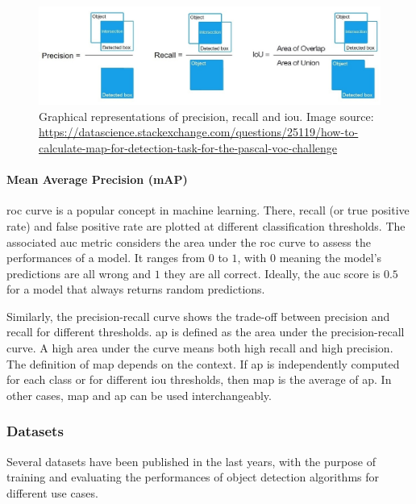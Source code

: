 \documentclass[%
    corpo=12pt,
    twoside,
    stile=classica,   
    tipotesi=magistrale,
    evenboxes,
    english,
	numerazioneromana,
]{toptesi}
\begin{document}
\begin{figure}[t]
	\centering
	\includegraphics[width=.95\linewidth]{imgs/precision_recall_iou.jpg}
	\caption[Graphical representations of precision, recall and \gls{iou}]{Graphical representations of precision, recall and \gls{iou}. Image source: \url{https://datascience.stackexchange.com/questions/25119/how-to-calculate-map-for-detection-task-for-the-pascal-voc-challenge}}
	\label{fig:iou}
\end{figure}

\paragraph{Mean Average Precision (mAP)}
\gls{roc} curve is a popular concept in machine learning. There, recall (or true positive rate) and false positive rate are plotted at different classification thresholds. The associated \gls{auc} metric considers the area under the \gls{roc} curve to assess the performances of a model.\cite{roc} It ranges from $ 0 $ to $ 1 $, with $ 0 $ meaning the model's predictions are all wrong and $ 1 $ they are all correct. Ideally, the \gls{auc} score is $ 0.5 $ for a model that always returns random predictions.

Similarly, the precision-recall curve shows the trade-off between precision and recall for different thresholds\cite{precrecall}. \gls{ap} is defined as the area under the precision-recall curve. A high area under the curve means both high recall and high precision. The definition of \gls{map} depends on the context. If \gls{ap} is independently computed for each class or for different \gls{iou} thresholds, then \gls{map} is the average of \gls{ap}. In other cases, \gls{map} and \gls{ap} can be used interchangeably.


\subsubsection{Datasets}\label{sec:datasets}
Several datasets have been published in the last years, with the purpose of training and evaluating the performances of object detection algorithms for different use cases.
\end{document}
